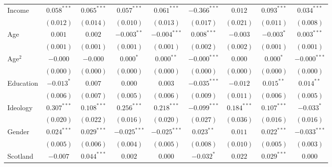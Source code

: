 \documentclass{article}
\begin{document}
\begin{table}
\begin{center}
{\begin{tabular}{l c c c c c c c c }
Income                           & $0.058^{***}$  & $0.065^{***}$  & $0.057^{***}$  & $0.061^{***}$  & $-0.366^{***}$ & $0.012$        & $0.093^{***}$  & $0.034^{***}$  \\
                                 & $(0.012)$      & $(0.014)$      & $(0.010)$      & $(0.013)$      & $(0.017)$      & $(0.021)$      & $(0.011)$      & $(0.008)$      \\
Age                              & $0.001$        & $0.002$        & $-0.003^{**}$  & $-0.004^{***}$ & $0.008^{***}$  & $-0.003$       & $-0.003^{*}$   & $0.003^{***}$  \\
                                 & $(0.001)$      & $(0.001)$      & $(0.001)$      & $(0.001)$      & $(0.002)$      & $(0.002)$      & $(0.001)$      & $(0.001)$      \\
Age$^2$                            & $-0.000$       & $-0.000$       & $0.000^{*}$    & $0.000^{**}$   & $-0.000^{***}$ & $0.000$        & $0.000^{*}$    & $-0.000^{***}$ \\
                                 & $(0.000)$      & $(0.000)$      & $(0.000)$      & $(0.000)$      & $(0.000)$      & $(0.000)$      & $(0.000)$      & $(0.000)$      \\
Education                        & $-0.013^{*}$   & $0.007$        & $0.000$        & $0.003$        & $-0.035^{***}$ & $-0.012$       & $0.015^{**}$   & $0.014^{**}$   \\
                                 & $(0.006)$      & $(0.007)$      & $(0.005)$      & $(0.006)$      & $(0.009)$      & $(0.011)$      & $(0.006)$      & $(0.005)$      \\
Ideology                         & $0.307^{***}$  & $0.108^{***}$  & $0.256^{***}$  & $0.218^{***}$  & $-0.099^{***}$ & $0.184^{***}$  & $0.107^{***}$  & $-0.033^{*}$   \\
                                 & $(0.020)$      & $(0.022)$      & $(0.016)$      & $(0.020)$      & $(0.027)$      & $(0.036)$      & $(0.016)$      & $(0.016)$      \\
Gender                           & $0.024^{***}$  & $0.029^{***}$  & $-0.025^{***}$ & $-0.025^{***}$ & $0.023^{**}$   & $0.011$        & $0.022^{***}$  & $-0.033^{***}$ \\
                                 & $(0.005)$      & $(0.006)$      & $(0.004)$      & $(0.005)$      & $(0.008)$      & $(0.010)$      & $(0.005)$      & $(0.003)$      \\
Scotland                         & $-0.007$       & $0.044^{***}$  & $0.002$        & $0.000$        & $-0.032^{*}$   & $0.022$        & $0.029^{***}$  & $0.000$        \\

\end{tabular}}
\end{center}
\end{table}
\end{document}
